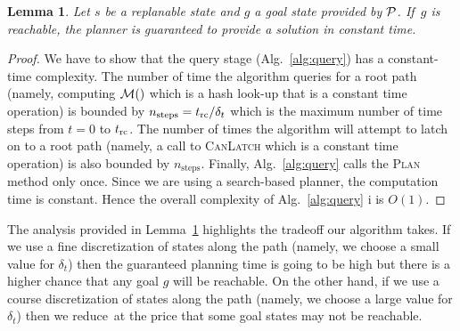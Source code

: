 \documentclass[conference]{IEEEtran}
\newtheorem{lemma}{Lemma}
\begin{document}
\begin{lemma}
\label{lemma:bounded_time}
Let $s$ be a replanable state and $g$ a goal state provided by $\mathcal{P}$.
If~$g$ is reachable, the planner is guaranteed to provide a solution in constant time.
\end{lemma}

\begin{proof}
    We have to show that the query stage (Alg.~\ref{alg:query}) has a constant-time complexity. 
    The number of time the algorithm queries for a root path (namely, computing $\mathcal{M}()$  which is a hash look-up that is a constant time operation) is bounded by $n_{\textrm{steps}} = t_{\textrm{rc}}/\delta_t$ which is the maximum number of time steps from $t = 0$ to $t_{\textrm{rc}}$. 
    The number of times the algorithm will attempt to latch on to a root path (namely, a call to \textsc{CanLatch}  which is a constant time operation) is also bounded by $n_{\textrm{steps}}$. Finally, Alg.~\ref{alg:query} calls the \textsc{Plan} method only once.
    Since we are using a search-based planner, the computation time is constant. 
    Hence the overall complexity of Alg.~\ref{alg:query} i is $O(1)$.
\end{proof}

The analysis provided in Lemma~\ref{lemma:bounded_time} highlights the tradeoff our algorithm takes.
If we use a fine discretization of states along the path (namely, we choose a small value for $\delta_t$) then the guaranteed  planning time \Tbound is going to be high but there is a higher chance that any goal $g$ will be reachable.
On the other hand, if we use a course discretization of states along the path (namely, we choose a large value for $\delta_t$) then we reduce~\Tbound at the price that some goal states may not be reachable.
%





\end{document}
